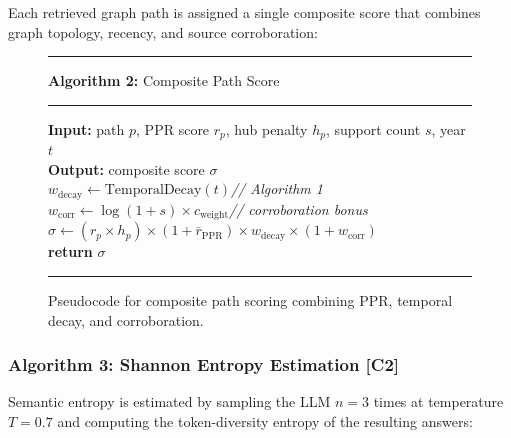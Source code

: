 Each retrieved graph path is assigned a single composite score that combines graph topology, recency, and source corroboration:

\begin{figure}[H]
\centering
\begin{minipage}{0.82\textwidth}
\hrule\vspace{4pt}
\textbf{Algorithm 2:} Composite Path Score
\vspace{4pt}\hrule\vspace{6pt}
\textbf{Input:} path $p$, PPR score $r_p$, hub penalty $h_p$, support count $s$, year $t$\\
\textbf{Output:} composite score $\sigma$\\[4pt]
$w_{\text{decay}} \leftarrow \text{TemporalDecay}(t)$\hfill\textit{// Algorithm 1}\\
$w_{\text{corr}} \leftarrow \log(1 + s) \times c_{\text{weight}}$\hfill\textit{// corroboration bonus}\\
$\sigma \leftarrow (r_p \times h_p) \times (1 + \bar{r}_{\text{PPR}}) \times w_{\text{decay}} \times (1 + w_{\text{corr}})$\\
\textbf{return} $\sigma$
\vspace{6pt}\hrule
\end{minipage}
\caption{Pseudocode for composite path scoring combining PPR, temporal decay, and corroboration.}
\label{alg:score}
\end{figure}

\subsubsection{Algorithm 3: Shannon Entropy Estimation [C2]}

Semantic entropy is estimated by sampling the LLM $n=3$ times at temperature $T=0.7$ and computing the token-diversity entropy of the resulting answers:

